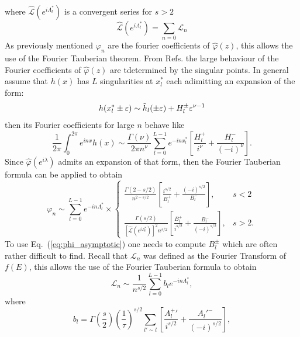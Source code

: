 \documentclass[12pt]{article}
\numberwithin{equation}{section}
\newcommand{\1}{\mathbb{1}}
\newcommand{\zphi}{\hat{\varphi}(z)}
\newcommand{\Lvanhove}{\Lambda^*_l}
\begin{document}
where $\hat{\mathcal{L}}(e^{i\Lvanhove})$ is a convergent series for $s>2$
\begin{equation}
    \hat{\mathcal{L}}(e^{i\Lvanhove})=\sum_{n=0}\mathcal{L}_n
\end{equation}
As previously mentioned $\varphi_n$ are the fourier coefficients of $\zphi$, this allows the use of the Fourier Tauberian theorem. From Refs.\cite{erdélyi1956asymptotic,Gamkrelidze1989-0} the large behaviour of the Fourier coefficients of $\zphi$ are tdetermined by the singular points. In general assume that $h(x)$ has $L$ singularities at $x^*_l$ each adimitting an expansion of the form:
\begin{equation}
    h(x_l^*\pm\varepsilon)\sim \Tilde{h}_l(\pm\varepsilon)+H_l^{\pm}\varepsilon^{\nu-1}
\end{equation}
then its Fourier coefficients for large $n$ behave like 
\begin{equation}
    \frac{1}{2\pi}\int_0^{2\pi}e^{inx}h(x)\sim\frac{\Gamma(\nu)}{2\pi n^{\nu}}\sum_{l=0}^{L-1}e^{-inx_l^*}\left[\frac{H^+_l}{i^{\nu}}+\frac{H_l^-}{(-i)^\nu}\right].
\end{equation}
Since $\hat{\varphi}(e^{i\lambda})$ admits an expansion of that form, then the Fourier Tauberian formula can be applied to obtain
\begin{equation} \label{eq:phi_asymptotic}
    \varphi_n\sim \sum_{l=0}^{L-1}e^{-in\Lvanhove}\times
    \begin{cases}
        \frac{\Gamma(2-s/2)}{n^{2-s/2}}\left[\frac{i^{s/2}}{B_l^+}+\frac{(-i)^{s/2}}{B_l^-}\right], & s<2
        \\
        \frac{\Gamma(s/2)}{[\hat{\mathcal{L}}(e^{i\Lvanhove})]^2n^{s/2}}\left[\frac{B_l^+}{i^{s/2}}+\frac{B_l^-}{(-i)^{s/2}}\right], & s>2.
    \end{cases} 
\end{equation}
To use Eq.~(\ref{eq:phi_asymptotic}) one needs to compute $B_l^{\pm}$ which are often rather difficult to find. Recall that $\mathcal{L}_n$ was defined as the Fourier Transform of $f(E)$, this allows the use of the Fourier Tauberian formula to obtain
\begin{equation}
    \mathcal{L}_n\sim \frac{1}{n^{s/2}}\sum_{l=0}^{L-1} b_l e^{-in\Lvanhove}, \label{eq:loschmidt_asymptote}
\end{equation}
where 
\begin{equation}
    b_l=\Gamma\left(\frac{s}{2}\right)\left(\frac{1}{\tau}\right)^{s/2} \sum_{l'\sim l} \left[\frac{A^+_l'}{i^{s/2}}+\frac{A_l'^-}{(-i)^{s/2}}\right],
\end{equation}
\end{document}
